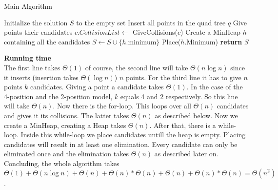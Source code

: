 \documentclass[crop=false,a4paper,oneside,11pt]{article}
\begin{document}
\begin{algorithm}[H]
\caption{Main Algorithm}
\begin{algorithmic}[1]
\State Initialize the solution $S$ to the empty set
\State Insert all points in the quad tree $q$
\State Give points their candidates
\State $c.CollisionList\gets$ GiveCollisions($c$)
\EndFor
\State Create a MinHeap $h$ containing all the candidates
\State $S\gets S\cup \{h.$minimum$\}$
\State Place($h$.Minimum)
\EndWhile
\State \textbf{return} $S$
\EndProcedure
\end{algorithmic}
\end{algorithm}
\textbf{Running time}\\
The first line takes $\Theta(1)$ of course, the second line will take $\Theta(n\log n)$ since it inserts (insertion takes $\Theta(\log n)$) $n$ points. For the third line it has to give $n$ points $k$ candidates. Giving a point a candidate takes $\Theta(1)$. In the case of the 4-position and the 2-position model, $k$ equals 4 and 2 respectively. So this line will take $\Theta(n)$. Now there is the for-loop. This loops over all $\Theta(n)$ candidates and gives it its collisions. The latter takes $\Theta(n)$ as described below. Now we create a MinHeap, creating a Heap takes $\Theta(n)$. After that, there is a while-loop. Inside this while-loop we place candidates untill the heap is empty. Placing candidates will result in at least one elimination. Every candidate can only be eliminated once and the elimination takes $\Theta(n)$ as described later on. Concluding, the whole algorithm takes $\Theta(1)+\Theta(n\log n)+\Theta(n)+\Theta(n)*\Theta(n)+\Theta(n)+\Theta(n)*\Theta(n)=\Theta(n^2)$.
\end{document}
